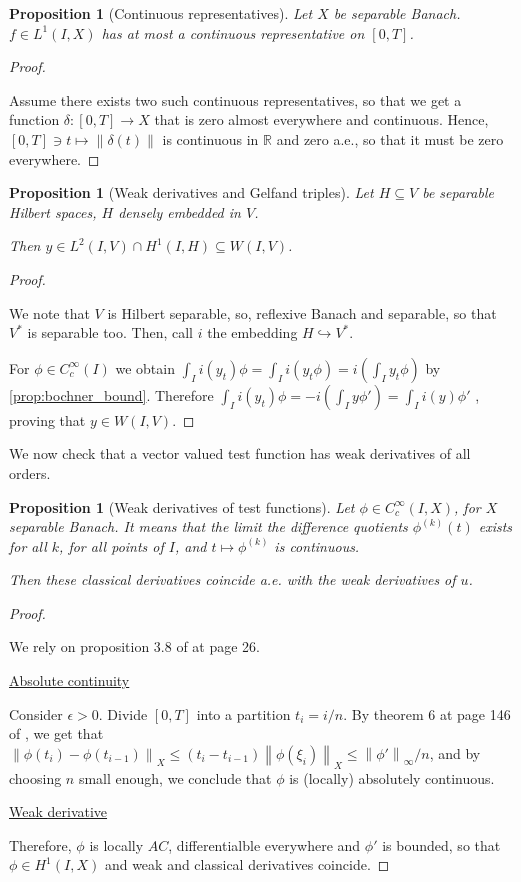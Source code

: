\documentclass[english,a4paper,12pt,oneside]{scrbook}
\theoremstyle{break}
\newtheorem{prop}[equation]{Proposition}
\newenvironment{mproof}[1][\proofname]{%
  \begin{proof}[#1]$ $\par\nobreak\ignorespaces
}{%
  \end{proof}
}
\renewcommand*{\proofname}{Proof}
\theoremstyle{remark}
\newcommand{\mR}{\mathbb{R}}
\newcommand{\ds}{\displaystyle}
\newcommand{\norm}[1]{\left\lVert#1\right\rVert}
\newcommand{\emb}{\hookrightarrow}
\begin{document}
\begin{prop}[Continuous representatives]
\label{prop:cts_repr}
Let $X$ be separable Banach. $f \in L^1(I,X)$ has at most a continuous representative on $[0,T]$.
\end{prop}
\begin{mproof}
Assume there exists two such continuous representatives, so that we get a function $\delta: [0,T] \rightarrow X$ that is zero almost everywhere and continuous. Hence, $[0,T] \ni t \mapsto \norm{\delta(t)}$ is continuous in $\mR$ and zero a.e., so that it must be zero everywhere.
\end{mproof}

\begin{prop}[Weak derivatives and Gelfand triples]
\label{prop:sob_implies_W}
Let $H\subseteq V$ be separable Hilbert spaces, $H$ densely embedded in $V$.

Then $y \in L^2(I,V)\cap H^1(I,H) \subseteq W(I,V)$.
\end{prop}
\begin{mproof}
We note that $V$ is Hilbert separable, so, reflexive Banach and separable, so that $V^*$ is separable too. Then, call $i$ the embedding $H \emb V^*$.

For $\phi \in C^\infty_c(I)$ we obtain $\int_I i(y_t)\phi=\int_I i(y_t\phi)= i \left ( \int_I y_t\phi \right )$ by \cref{prop:bochner_bound}. Therefore $\int_I i(y_t)\phi=-i \left ( \int_I y\phi' \right ) =\int_I i(y)\phi'  $ , proving that $y \in W(I,V)$.

\end{mproof}

We now check that a vector valued test function has weak derivatives of all orders.

\begin{prop}[Weak derivatives of test functions]
\label{prop:weak_class}
Let $\phi \in C^\infty_c(I,X)$, for $X$ separable Banach. It means that the limit the difference quotients $\phi^{(k)}(t)$ exists for all $k$, for all points of $I$, and $t\mapsto \phi^{(k)}$ is continuous.

Then these classical derivatives coincide a.e. with the weak derivatives of $u$.

\end{prop}
\begin{mproof}

We rely on proposition 3.8 of \cite{kreuter} at page 26.

\underline{Absolute continuity}

Consider $\epsilon >0$. Divide $[0,T]$ into a partition $t_i=i/n$. By theorem 6 at page 146 of \cite{mvt}, we get that $\ds \norm{\phi(t_i)-\phi(t_{i-1})}_X \leq (t_i-t_{i-1})\norm{\phi(\xi_i)}_X\leq \norm{\phi'}_{\infty}/n$, and by choosing $n$ small enough, we conclude that $\phi$ is (locally) absolutely continuous.

\underline{Weak derivative}

Therefore, $\phi$ is locally $AC$, differentialble everywhere and $\phi'$ is bounded, so that $\phi \in H^1(I,X)$ and weak and classical derivatives coincide. 

\end{mproof}
\end{document}
